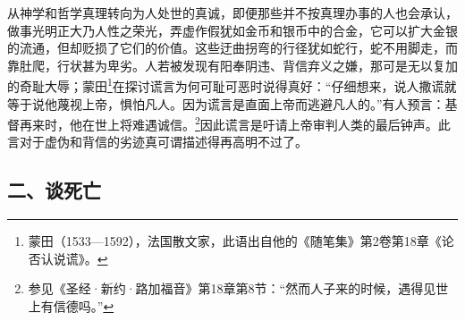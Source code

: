 \par 从神学和哲学真理转向为人处世的真诚，即便那些并不按真理办事的人也会承认，做事光明正大乃人性之荣光，弄虚作假犹如金币和银币中的合金，它可以扩大金银的流通，但却贬损了它们的价值。这些迂曲拐弯的行径犹如蛇行，蛇不用脚走，而靠肚爬，行状甚为卑劣。人若被发现有阳奉阴违、背信弃义之嫌，那可是无以复加的奇耻大辱；蒙田\footnote{蒙田（1533—1592），法国散文家，此语出自他的《随笔集》第2卷第18章《论否认说谎》。}在探讨谎言为何可耻可恶时说得真好：“仔细想来，说人撒谎就等于说他蔑视上帝，惧怕凡人。因为谎言是直面上帝而逃避凡人的。”有人预言：基督再来时，他在世上将难遇诚信。\footnote{参见《圣经·新约·路加福音》第18章第8节：“然而人子来的时候，遇得见世上有信德吗。”}因此谎言是吁请上帝审判人类的最后钟声。此言对于虚伪和背信的劣迹真可谓描述得再高明不过了。



\subsection*{二、谈死亡}

